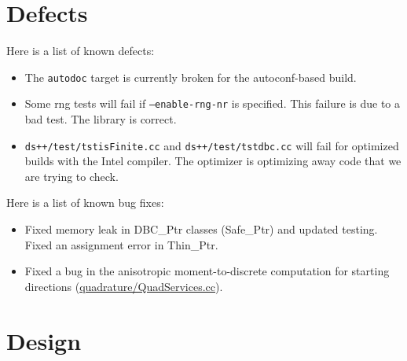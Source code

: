 \documentclass[note]{ResearchNote}
\begin{document}
\section{Defects}
Here is a list of known defects:
\begin{itemize}
\item The \texttt{autodoc} target is currently broken for the
  autoconf-based build.
\item Some \textsf{rng} tests will fail if \texttt{--enable-rng-nr} is
  specified.  This failure is due to a bad test.  The library is
  correct.
\item \texttt{ds++/test/tstisFinite.cc} and
  \texttt{ds++/test/tstdbc.cc} will fail for optimized builds with the
  Intel compiler.  The optimizer is optimizing away code that we are
  trying to check.
\end{itemize}

\noindent Here is a list of known bug fixes:
\begin{itemize}
\item Fixed memory leak in \textsf{DBC\_Ptr} classes
  (\textsf{Safe\_Ptr}) and updated testing.  Fixed an assignment error
  in \textsf{Thin\_Ptr}.
\item Fixed a bug in the anisotropic moment-to-discrete computation
  for starting directions (\url{quadrature/QuadServices.cc}).
\end{itemize}


\section{Design}
\end{document}
